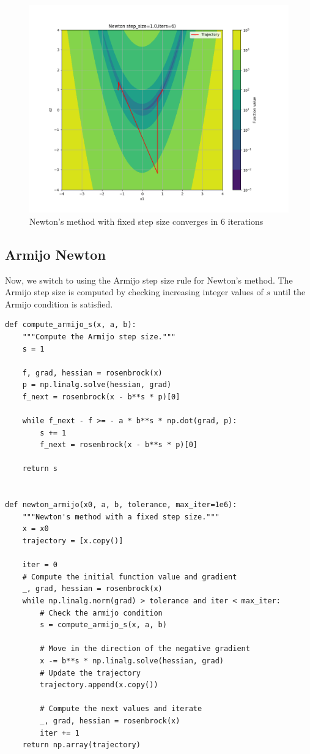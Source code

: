 \documentclass[11pt]{article}
\theoremstyle{problemstyle}
\begin{document}
\begin{figure}[H]
  \centering
  \includegraphics[width=.9\textwidth]{newton.png}
  \caption{Newton's method with fixed step size converges in 6 iterations}
  \label{fig:newton_fixed}
\end{figure}

\subsection*{Armijo Newton}
Now, we switch to using the Armijo step size rule for Newton's method. The
Armijo step size is computed by checking increasing integer values of $s$ until
the Armijo condition is satisfied.
\begin{verbatim}
def compute_armijo_s(x, a, b):
    """Compute the Armijo step size."""
    s = 1

    f, grad, hessian = rosenbrock(x)
    p = np.linalg.solve(hessian, grad)
    f_next = rosenbrock(x - b**s * p)[0]

    while f_next - f >= - a * b**s * np.dot(grad, p):
        s += 1
        f_next = rosenbrock(x - b**s * p)[0]

    return s


def newton_armijo(x0, a, b, tolerance, max_iter=1e6):
    """Newton's method with a fixed step size."""
    x = x0
    trajectory = [x.copy()]

    iter = 0
    # Compute the initial function value and gradient
    _, grad, hessian = rosenbrock(x)
    while np.linalg.norm(grad) > tolerance and iter < max_iter:
        # Check the armijo condition
        s = compute_armijo_s(x, a, b)

        # Move in the direction of the negative gradient
        x -= b**s * np.linalg.solve(hessian, grad)
        # Update the trajectory
        trajectory.append(x.copy())

        # Compute the next values and iterate
        _, grad, hessian = rosenbrock(x)
        iter += 1
    return np.array(trajectory)
\end{verbatim}
\end{document}
